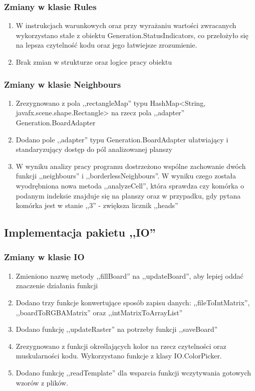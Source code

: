 \documentclass[a4paper,11pt]{article}
\begin{document}
\subsubsection{Zmiany w klasie Rules}
\begin{enumerate}
\item W instrukcjach warunkowych oraz przy wyrażaniu wartości zwracanych wykorzystano stałe z obiektu Generation.StatusIndicators, co przełożyło się na lepsza czytelność kodu oraz jego łatwiejsze zrozumienie.
\item Brak zmian w strukturze oraz logice pracy obiektu
\end{enumerate}
\subsubsection{Zmiany w klasie Neighbours}
\begin{enumerate}
\item Zrezygnowano z pola ,,rectangleMap'' typu HashMap<String, javafx.scene.shape.Rectangle> na rzecz pola ,,adapter'' Generation.BoardAdapter
\item Dodano pole ,,adapter'' typu Generation.BoardAdapter ułatwiający i standaryzujący dostęp do pól analizowanej planszy
\item W wyniku analizy pracy programu dostrzeżono wspólne zachowanie dwóch funkcji ,,neighbours'' i ,,borderlessNeighbours''. W wyniku czego została wyodrębniona nowa metoda ,,analyzeCell'', która sprawdza czy komórka o podanym indeksie znajduje się na planszy oraz w przypadku, gdy pytana komórka jest w stanie ,,3'' - zwiększa licznik ,,heads''
\end{enumerate}

\subsection{Implementacja pakietu ,,IO''}
\subsubsection{Zmiany w klasie IO}
\begin{enumerate}
\item Zmieniono nazwę metody ,,fillBoard'' na ,,updateBoard'', aby lepiej oddać znaczenie działania funkcji
\item Dodano trzy funkcje konwertujące sposób zapisu danych: ,,fileToIntMatrix'', ,,boardToRGBAMatrix'' oraz ,,intMatrixToArrayList''
\item Dodano funkcję ,,updateRaster'' na potrzeby funkcji ,,saveBoard''
\item Zrezygnowano z funkcji określających kolor na rzecz czytelności oraz muskularności kodu. Wykorzystano funkcje z klasy IO.ColorPicker.
\item Dodano funkcję ,,readTemplate'' dla wsparcia funkcji wczytywania gotowych wzorów z plików.
\end{enumerate}
\end{document}
